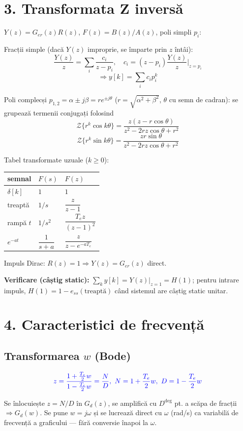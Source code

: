 \documentclass[8.2pt,a4paper,twocolumn]{extarticle}
\begin{document}
\section*{3. Transformata Z inversă}
$Y(z)=G_{er}(z)R(z)$, $F(z)=B(z)/A(z)$, poli simpli $p_i$:
\begin{res}
Fracții simple (dacă $Y(z)$ improprie, se împarte prin $z$ întâi):
$$\frac{Y(z)}{z}=\sum_i\frac{c_i}{z-p_i},\quad c_i=(z-p_i)\frac{Y(z)}{z}\bigg|_{z=p_i}$$
$$\Rightarrow y[k]=\sum_i c_ip_i^k$$
\end{res}
Poli complecși $p_{1,2}=\alpha\pm j\beta=re^{\pm j\theta}$ ($r=\sqrt{\alpha^2+\beta^2}$, $\theta$ cu semn de cadran): se grupează termenii conjugați folosind
$$\mathcal Z\{r^k\cos k\theta\}=\frac{z(z-r\cos\theta)}{z^2-2rz\cos\theta+r^2}$$
$$\mathcal Z\{r^k\sin k\theta\}=\frac{zr\sin\theta}{z^2-2rz\cos\theta+r^2}$$

Tabel transformate uzuale ($k\ge0$):
\begin{center}
\small
\begin{tabular}{lll}
semnal & $F(s)$ & $F(z)$\\\hline
$\delta[k]$ & $1$ & $1$\\
treaptă & $1/s$ & $\dfrac{z}{z-1}$\\
rampă $t$ & $1/s^2$ & $\dfrac{T_ez}{(z-1)^2}$\\
$e^{-at}$ & $\dfrac1{s+a}$ & $\dfrac{z}{z-e^{-aT_e}}$\\
\end{tabular}
\end{center}
Impuls Dirac: $R(z)=1\Rightarrow Y(z)=G_{er}(z)$ direct.

\textbf{Verificare (câștig static):} $\displaystyle\sum_k y[k]=Y(z)\big|_{z=1}=H(1)$; pentru intrare impuls, $H(1)=1-e_{ss}(\text{treaptă})$ când sistemul are câștig static unitar.

\section*{4. Caracteristici de frecvență}
\subsection*{Transformarea $w$ (Bode)}
\begin{res}
$$\color{blue}z=\frac{1+\frac{T_e}2w}{1-\frac{T_e}2w}=\frac ND,\ N=1+\frac{T_e}2w,\ D=1-\frac{T_e}2w$$
\end{res}
Se înlocuiește $z=N/D$ în $G_d(z)$, se amplifică cu $D^{\deg}$ pt. a scăpa de fracții $\Rightarrow G_d(w)$. Se pune $w=j\omega$ și se lucrează direct cu $\omega$ (rad/s) ca variabilă de frecvență a graficului --- fără conversie înapoi la $\omega$.
\end{document}
